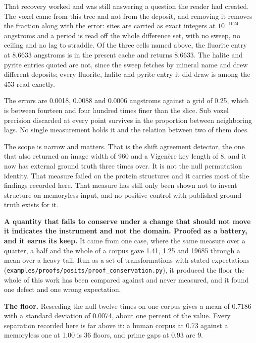That recovery worked and was still answering a question the reader had created. The voxel came from this tree and not from the deposit, and removing it removes the fraction along with the error: sites are carried as exact integers at \(10^{-1024}\) angstroms and a period is read off the whole difference set, with no sweep, no ceiling and no lag to straddle. Of the three cells named above, the fluorite entry at 8.6633 angstroms is in the present cache and returns 8.6633. The halite and pyrite entries quoted are not, since the sweep fetches by mineral name and drew different deposits; every fluorite, halite and pyrite entry it did draw is among the 453 read exactly.

The errors are 0.0018, 0.0088 and 0.0006 angstroms against a grid of 0.25, which is between fourteen and four hundred times finer than the slice. Sub voxel precision discarded at every point survives in the proportion between neighboring lags. No single measurement holds it and the relation between two of them does.

The scope is narrow and matters. That is the shift agreement detector, the one that also returned an image width of 960 and a Vigenère key length of 8, and it now has external ground truth three times over. It is not the null permutation identity. That measure failed on the protein structures and it carries most of the findings recorded here. That measure has still only been shown not to invent structure on memoryless input, and no positive control with published ground truth exists for it.

\textbf{A quantity that fails to conserve under a change that should not move it indicates the instrument and not the domain. Proofed as a battery, and it earns its keep.} It came from one case, where the same measure over a quarter, a half and the whole of a corpus gave 1.41, 1.25 and 19685 through a mean over a heavy tail. Run as a set of transformations with stated expectations (\texttt{examples/\allowbreak{}proofs/\allowbreak{}posits/\allowbreak{}proof\_\allowbreak{}conservation.\allowbreak{}py}), it produced the floor the whole of this work has been compared against and never measured, and it found one defect and one wrong expectation.

\textbf{The floor.} Reseeding the null twelve times on one corpus gives a mean of 0.7186 with a standard deviation of 0.0074, about one percent of the value. Every separation recorded here is far above it: a human corpus at 0.73 against a memoryless one at 1.00 is 36 floors, and prime gaps at 0.93 are 9.

